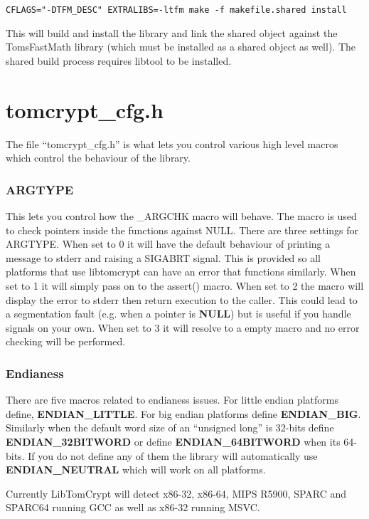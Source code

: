 \documentclass[a4paper]{book}
\begin{document}
\begin{verbatim}
CFLAGS="-DTFM_DESC" EXTRALIBS=-ltfm make -f makefile.shared install
\end{verbatim}

This will build and install the library and link the shared object against the TomsFastMath library (which must be installed as a shared object as well).  The 
shared build process requires libtool to be installed.

\section{tomcrypt\_cfg.h}
The file ``tomcrypt\_cfg.h'' is what lets you control various high level macros which control the behaviour 
of the library. 

\subsubsection{ARGTYPE}
This lets you control how the \_ARGCHK macro will behave.  The macro is used to check pointers inside the functions against
NULL.  There are three settings for ARGTYPE.  When set to 0 it will have the default behaviour of printing a message to 
stderr and raising a SIGABRT signal.  This is provided so all platforms that use libtomcrypt can have an error that functions
similarly.  When set to 1 it will simply pass on to the assert() macro.  When set to 2 the macro will display the error to
stderr then return execution to the caller.  This could lead to a segmentation fault (e.g. when a pointer is \textbf{NULL}) but is useful
if you handle signals on your own.  When set to 3 it will resolve to a empty macro  and no error checking will be performed.

\subsubsection{Endianess}
There are five macros related to endianess issues.  For little endian platforms define, \textbf{ENDIAN\_LITTLE}.  For big endian
platforms define \textbf{ENDIAN\_BIG}.  Similarly when the default word size of an ``unsigned long'' is 32-bits define \textbf{ENDIAN\_32BITWORD}
or define \textbf{ENDIAN\_64BITWORD} when its 64-bits.  If you do not define any of them the library will automatically use \textbf{ENDIAN\_NEUTRAL}
which will work on all platforms.

Currently LibTomCrypt will detect x86-32, x86-64, MIPS R5900, SPARC and SPARC64 running GCC as well as x86-32 running MSVC.  
\end{document}

